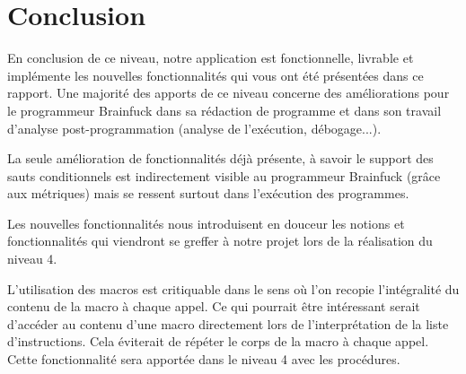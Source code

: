 \documentclass[titlepage]{article}
\begin{document}
\section{Conclusion}
En conclusion de ce niveau, notre application est fonctionnelle, livrable et implémente les nouvelles fonctionnalités qui vous ont été présentées dans ce rapport. Une majorité des apports de ce niveau concerne des améliorations pour le programmeur Brainfuck dans sa rédaction de programme et dans son travail d'analyse post-programmation (analyse de l'exécution, débogage...). 

La seule amélioration de fonctionnalités déjà présente, à savoir le support des sauts conditionnels est indirectement visible au programmeur Brainfuck (grâce aux métriques) mais se ressent surtout dans l'exécution des programmes. 

Les nouvelles fonctionnalités nous introduisent en douceur les notions et fonctionnalités qui viendront se greffer à notre projet lors de la réalisation du niveau 4. 

L'utilisation des macros est critiquable dans le sens où l'on recopie l'intégralité du contenu de la macro à chaque appel. Ce qui pourrait être intéressant serait d'accéder au contenu d'une macro directement lors de l'interprétation de la liste d'instructions. Cela éviterait de répéter le corps de la macro à chaque appel. Cette fonctionnalité sera apportée dans le niveau 4 avec les procédures.
\end{document}
